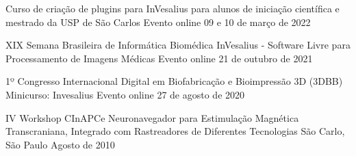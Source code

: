 \begin{cventries}

  \cventry
  {}
  {Curso de criação de plugins para InVesalius para alunos de iniciação científica e mestrado da USP de São Carlos}
  {Evento online}
  {09 e 10 de março de 2022}
  {}

  \cventry
  {XIX Semana Brasileira de Informática Biomédica}
  {InVesalius - Software Livre para Processamento de Imagens Médicas}
  {Evento online}
  {21 de outubro de 2021}
  {}

  \cventry
  {1º Congresso Internacional Digital em Biofabricação e Bioimpressão 3D (3DBB)}
  {Minicurso: Invesalius}
  {Evento online}
  {27 de agosto de 2020}
  {}



  \cventry
  {IV Workshop CInAPCe}
  {Neuronavegador para Estimulação Magnética Transcraniana, Integrado com Rastreadores de Diferentes Tecnologias}
  {São Carlo, São Paulo}
  {Agosto de 2010}
  {}

\end{cventries}
